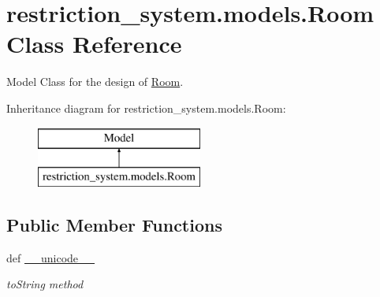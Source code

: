 \hypertarget{classrestriction__system_1_1models_1_1Room}{}\section{restriction\+\_\+system.\+models.\+Room Class Reference}
\label{classrestriction__system_1_1models_1_1Room}


Model Class for the design of \hyperlink{classrestriction__system_1_1models_1_1Room}{Room}.  


Inheritance diagram for restriction\+\_\+system.\+models.\+Room\+:\begin{figure}[H]
\begin{center}
\leavevmode
\includegraphics[height=2.000000cm]{classrestriction__system_1_1models_1_1Room}
\end{center}
\end{figure}
\subsection*{Public Member Functions}
\begin{DoxyCompactItemize}
\item 
def \hyperlink{classrestriction__system_1_1models_1_1Room_a1ccb980351b8038fdde3da7b0b89cae9}{\+\_\+\+\_\+unicode\+\_\+\+\_\+}
\begin{DoxyCompactList}\small\item\em to\+String method \end{DoxyCompactList}\end{DoxyCompactItemize}
